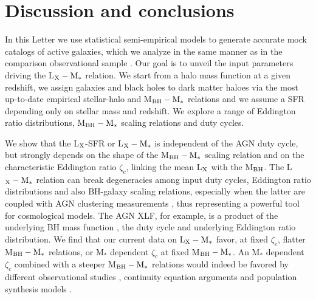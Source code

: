 \section{Discussion and conclusions}\label{sec:disc_concl}

In this Letter we use statistical semi-empirical models to generate accurate mock catalogs of active galaxies, which we analyze in the same manner as in the comparison observational sample  \citep{2020A&A...642A..65C}. Our goal is to unveil the input parameters driving the L$_{\rm X}-{\rm M}_*$ relation. We start from a halo mass function at a given redshift, we assign galaxies and black holes to dark matter haloes via the most up-to-date empirical stellar-halo and M$_{\rm BH}-{\rm M}_*$ relations and we assume a SFR depending only on stellar mass and redshift. We explore a range of Eddington ratio distributions, M$_{\rm BH}-{\rm M}_*$ scaling relations and duty cycles.

We show that the L$_{\rm X}$-SFR or L$_{\rm X}-{\rm M}_*$ is independent of the AGN duty cycle, but strongly depends on the shape of the M$_{\rm BH}-{\rm M}_*$ scaling relation and on the characteristic Eddington ratio $\zeta_c$, linking the mean L$_{\rm X}$ with the M$_{\rm BH}$. The L$_{\rm X}-{\rm M}_*$ relation can break degeneracies among input duty cycles, Eddington ratio distributions and also BH-galaxy scaling relations, especially when the latter are coupled with AGN clustering measurements \citep{ShankarNat}, thus representing a powerful tool for cosmological models. The AGN XLF, for example, is a product of the underlying BH mass function%
, the duty cycle and underlying Eddington ratio distribution.
We find that our current data on L$_{\rm X}-{\rm M}_*$ favor, at fixed $\zeta_c$, flatter M$_{\rm BH}-{\rm M}_*$ relations, or M$_*$ dependent $\zeta_c$ at fixed M$_{\rm BH}-{\rm M}_*$. An M$_*$ dependent $\zeta_c$ combined with a steeper M$_{\rm BH}-{\rm M}_*$ relations would indeed be favored by different observational studies \citep{2019ApJ...885L..36D, 2019MNRAS.484.4360A, 2020A&A...642A..65C}, continuity equation arguments \citep{Shankar13Acc,Aversa15} and population synthesis models \citep{2018MNRAS.476..436B}.

